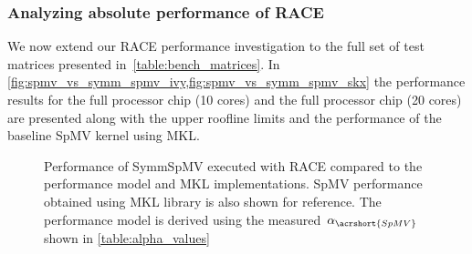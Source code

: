 \subsubsection{Analyzing absolute performance of RACE}
%
We now extend our \acrshort{RACE}  performance investigation to the full set of test matrices presented in~\cref{table:bench_matrices}. In \cref{fig:spmv_vs_symm_spmv_ivy,fig:spmv_vs_symm_spmv_skx} the performance results for the full \IVB processor chip (10 cores) and the full \SKX processor chip (20 cores) are presented along with the upper roofline limits and the performance of the baseline \acrshort{SpMV} kernel using \acrshort{MKL}.  
 \begin{figure}[tbp]
	\centering
	\hspace{1em}
	\caption{Performance of \acrshort{SymmSpMV} executed with \acrshort{RACE} compared to the performance model and \acrshort{MKL} implementations. \acrshort{SpMV} performance obtained using \acrshort{MKL} library is also shown for reference. The performance model is derived using the measured $\alpha_{\acrshort{SpMV}}$ shown in \cref{table:alpha_values}}
	\label{fig:SpMV_vs_SymmSpMV}
\end{figure}
